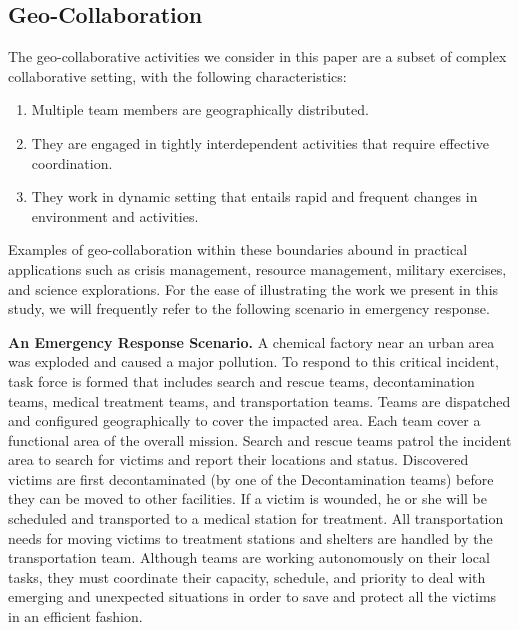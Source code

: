 \subsection{Geo-Collaboration} %
\label{sub:geo_collaboration}

The geo-collaborative activities we consider in this paper are a subset of complex collaborative setting, with the following characteristics: 

\begin{enumerate}
\item Multiple team members are geographically distributed.

\item They are engaged in tightly interdependent activities that require effective coordination.

\item They work in dynamic setting that entails rapid and frequent changes in environment and activities. 

\end{enumerate}

Examples of geo-collaboration within these boundaries abound in practical applications such as crisis management, resource management, military exercises, and science explorations. For the ease of illustrating the work we present in this study, we will frequently refer to the following scenario in emergency response.

\begin{scenario}
\textbf{An Emergency Response Scenario.} A chemical factory near an urban area was exploded and caused a major pollution. To respond to this critical incident, task force is formed that includes search and rescue teams, decontamination teams, medical treatment teams, and transportation teams. Teams are dispatched and configured geographically to cover the impacted area. Each team cover a functional area of the overall mission.  Search and rescue teams patrol the incident area to search for victims and report their locations and status. Discovered victims are first decontaminated (by one of the Decontamination teams) before they can be moved to other facilities.  If a victim is wounded, he or she will be scheduled and transported to a medical station for treatment. All transportation needs for moving victims to treatment stations and shelters are handled by the transportation team. Although teams are working autonomously on their local tasks, they must coordinate their capacity, schedule, and priority to deal with emerging and unexpected situations in order to save and protect all the victims in an efficient fashion.
\end{scenario}

